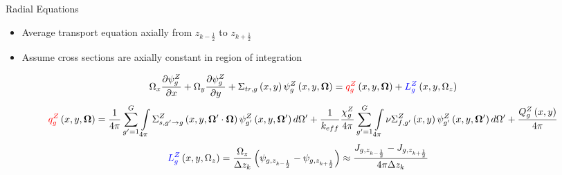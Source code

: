 \begin{frame}[t]{Radial Equations}
    
    \begin{itemize}
      \item Average transport equation axially from $z_{k-\frac{1}{2}}$ to 
      $z_{k+\frac{1}{2}}$
      \item Assume cross sections are axially constant in region of integration
    \end{itemize}
    \begin{dmath*}
        {\Omega_x\frac{\partial \psi_{g}^Z}{\partial x} + 
        \Omega_y\frac{\partial \psi_{g}^Z}{\partial y}} + 
        {\Sigma_{tr,g}\left(x,y\right)\psi_{g}^Z\left(x,y,\bm\Omega\right)} = 
        {\textcolor{red}{q_{g}^Z}\left(x,y,\bm \Omega\right)} + 
        {\textcolor{blue}{L_{g}^Z}\left(x,y,\Omega_z\right)}
    \end{dmath*}
    \begin{dmath*}
        {\textcolor{red}{q_{g}^Z}\left(x,y,\bm \Omega\right)} = 
        {\frac{1}{4\pi}\sum_{g'=1}^{G}\intop_{4\pi}\Sigma_{s,g'\rightarrow 
        g}^Z\left(x,y,\bm\Omega'\cdot\bm\Omega\right)\psi_{g'}^Z\left(x,y,\bm\Omega'\right)d\Omega'}
         + {\frac{1}{k_{eff}}\frac{\chi_{g}^Z}{4\pi}\sum_{g'=1}^G\intop_{4\pi} 
        \nu\Sigma_{f,g'}^Z\left(x,y\right)\psi_{g'}^Z\left(x,y,\bm\Omega'\right)d\Omega'}
         + {\frac{Q_{g}^Z\left(x,y\right)}{4\pi}}
    \end{dmath*}
    \begin{align*}
    \textcolor{blue}{L_{g}^Z}\left(x,y,\Omega_z\right) &= \frac{\Omega_z}{\Delta z_k}\left(\psi_{g,z_{k-\frac{1}{2}}} - \psi_{g,z_{k+\frac{1}{2}}}\right) \approx \frac{J_{g,z_{k-\frac{1}{2}}} - J_{g,z_{k+\frac{1}{2}}}}{4\pi\Delta z_k}
    \end{align*}
    
\end{frame}


